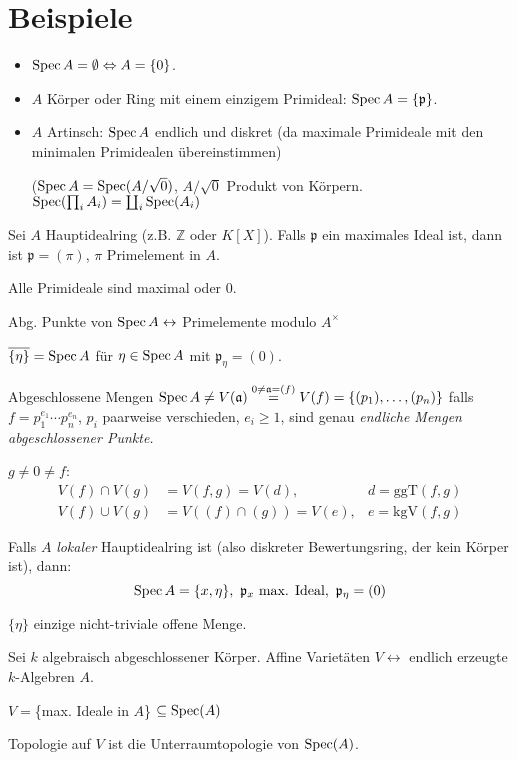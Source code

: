 \section{Beispiele}
\label{sec:beispiele-spektren}
\begin{itemize}
\item $\operatorname{Spec} A=\emptyset\Leftrightarrow A=\{0\}$.
\item $A$ Körper oder Ring mit einem einzigem Primideal: $\operatorname{Spec}
  A=\{\mathfrak{p}\}$.
\item $A$ Artinsch: $\operatorname{Spec} A$ endlich und diskret (da maximale
  Primideale mit den minimalen Primidealen übereinstimmen)

  ($\operatorname{Spec} A=\operatorname{Spec}(A/\sqrt{0})$, $A/\sqrt{0}$ Produkt von Körpern.
  $\operatorname{Spec}(\prod_{i} A_{i})=\coprod_{i}\operatorname{Spec}(A_{i})$
\end{itemize}

\begin{example}
\label{bsp:spec-von-hauptidealring}	
  Sei $A$ Hauptidealring (z.B. $\mathbb{Z}$ oder $K[X]$). Falls
  $\mathfrak{p}$ ein maximales Ideal ist, dann ist
  $\mathfrak{p}=(\pi)$, $\pi$ Primelement in $A$.

  Alle Primideale sind maximal oder 0.

  Abg. Punkte von $\operatorname{Spec} A\leftrightarrow$ Primelemente modulo $A^{\times}$

  $\overline{\{\eta\}}=\operatorname{Spec} A$ für $\eta\in\operatorname{Spec} A$ mit $\mathfrak{p}_{\eta}=(0)$.

  Abgeschlossene Mengen $\operatorname{Spec} A\neq
  V(\mathfrak{a})\overset{0\neq\mathfrak{a}=(f)}{=}V(f)=\{(p_{1}),\ldots,(p_{n})\}$
  falls $f=p_{1}^{e_{1}}\cdots p_{n}^{e_{n}}$, $p_{i}$ paarweise
  verschieden, $e_{i}\geq1$, sind genau \emph{endliche Mengen abgeschlossener Punkte.}

  $g\neq0\neq f$:
  \begin{align*}
    V(f)\cap V(g) & =V(f,g)=V(d), & d=\text{ggT}(f,g)\\
    V(f)\cup V(g) & =V((f)\cap(g))=V(e), & e=\text{kgV}(f,g)
  \end{align*}

  Falls $A$ \emph{lokaler} Hauptidealring ist (also diskreter
  Bewertungsring, der kein Körper ist), dann:
  \[
    \operatorname{Spec} A=\{x,\eta\},\ \mathfrak{p}_{x}\text{ max. Ideal},\
    \mathfrak{p}_{\eta}=(0)
  \]

  $\{\eta\}$ einzige nicht-triviale  offene Menge.
\end{example}
 
\begin{example}
\label{bsp:zusammenhang-affine-varietaeten}	
  Sei $k$ algebraisch abgeschlossener Körper. Affine Varietäten
  $V\leftrightarrow$ endlich erzeugte $k$-Algebren $A$.

  $V=$\{max. Ideale in $A$\} $\subseteq\operatorname{Spec}(A)$

  Topologie auf $V$ ist die Unterraumtopologie von $\operatorname{Spec}(A)$.
\end{example}
 
